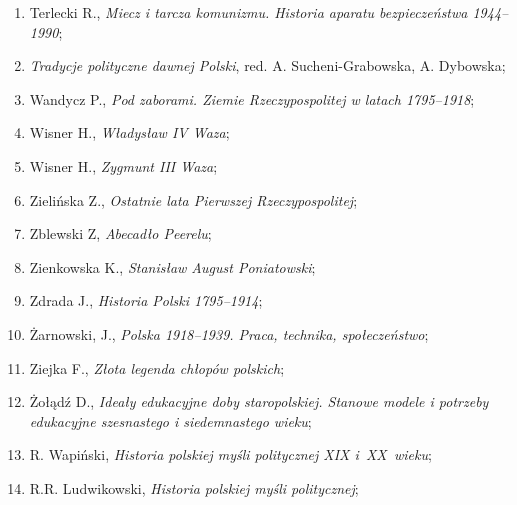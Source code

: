 \documentclass[a4paper,11pt]{article}
\begin{document}
\begin{enumerate}
\item Terlecki R., \textit{Miecz i tarcza komunizmu. Historia aparatu
    bezpieczeństwa 1944--1990};



\item \textit{Tradycje polityczne dawnej Polski}, red. A.
  Sucheni-Grabowska, A. Dybowska;



\item Wandycz P., \textit{Pod zaborami. Ziemie Rzeczypospolitej w latach
    1795--1918};



\item Wisner H., \textit{Władysław IV Waza};



\item Wisner H., \textit{Zygmunt III Waza};



\item Zielińska Z., \textit{Ostatnie lata Pierwszej Rzeczypospolitej};



\item Zblewski Z, \textit{Abecadło Peerelu};



\item Zienkowska K., \textit{Stanisław August Poniatowski};



\item Zdrada J., \textit{Historia Polski 1795--1914};



\item Żarnowski, J., \textit{Polska 1918--1939. Praca, technika,
    społeczeństwo};



\item Ziejka F., \textit{Złota legenda chłopów polskich};



\item Żołądź D., \textit{Ideały edukacyjne doby staropolskiej. Stanowe
    modele i potrzeby edukacyjne szesnastego i siedemnastego wieku};



\item R. Wapiński, \textit{Historia polskiej myśli politycznej XIX
    i~XX~wieku};



\item R.R. Ludwikowski, \textit{Historia polskiej myśli politycznej};




\end{enumerate}
\end{document}
